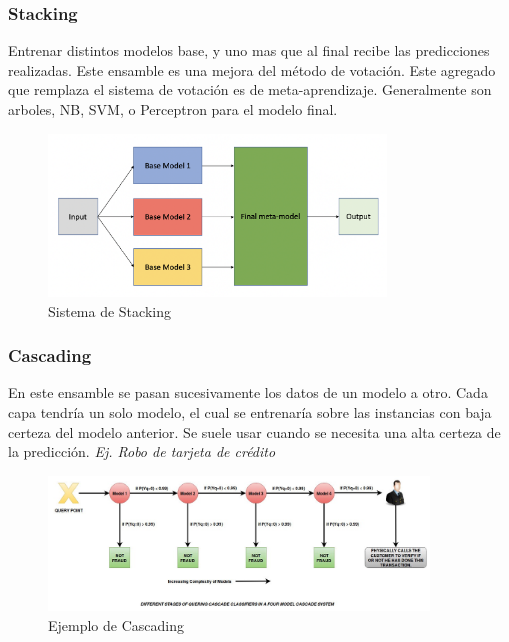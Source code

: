 \documentclass[titlepage,a4paper]{article}
\begin{document}
\newpage

\subsubsection{Stacking}
Entrenar distintos modelos base, y uno mas que al final recibe las predicciones realizadas. Este ensamble es una mejora del método de votación. Este agregado que remplaza el sistema de votación es de meta-aprendizaje. Generalmente son arboles, NB, SVM, o Perceptron para el modelo final.

\begin{figure}[!htb]
    \centering
    \includegraphics[width=0.8\textwidth]{imagenesResumen/Stacking.png}
    \caption{Sistema de Stacking}
\end{figure}

\subsubsection{Cascading}
En este ensamble se pasan sucesivamente los datos de un modelo a otro. Cada capa tendría un solo modelo, el cual se entrenaría sobre las instancias con baja certeza del modelo anterior. Se suele usar cuando se necesita una alta certeza de la predicción. \textit{Ej. Robo de tarjeta de crédito}


\begin{figure}[!htb]
    \centering
    \includegraphics[width=0.9\textwidth]{imagenesResumen/Cascading.jpeg}
    \caption{Ejemplo de Cascading}
\end{figure}
\end{document}
